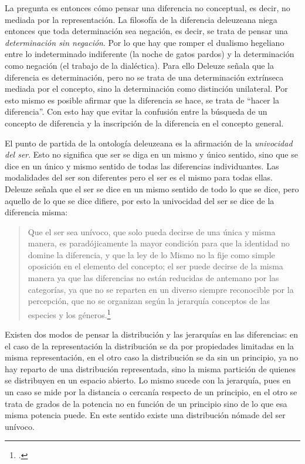 La pregunta es entonces cómo pensar una diferencia no conceptual, es
decir, no mediada por la representación. La filosofía de la diferencia
deleuzeana niega entonces que toda determinación sea negación, es decir,
se trata de pensar una \emph{determinación sin negación}. Por lo que hay
que romper el dualismo hegeliano entre lo indeterminado indiferente (la
noche de gatos pardos) y la determinación como negación (el trabajo de
la dialéctica). Para ello Deleuze señala que la diferencia es
determinación, pero no se trata de una determinación extrínseca mediada
por el concepto, sino la determinación como distinción unilateral. Por
esto mismo es posible afirmar que la diferencia se hace, se trata de
\enquote{hacer la diferencia}. Con esto hay que evitar la confusión entre la
búsqueda de un concepto de diferencia y la inscripción de la diferencia
en el concepto general.

El punto de partida de la ontología deleuzeana es la afirmación de la
\emph{univocidad del ser}. Esto no significa que ser se diga en un mismo
y único sentido, sino que se dice en un único y mismo sentido de todas
las diferencias individuantes. Las modalidades del ser son diferentes
pero el ser es el mismo para todas ellas. Deleuze señala que el ser se
dice en un mismo sentido de todo lo que se dice, pero aquello de lo que
se dice difiere, por esto la univocidad del ser se dice de la diferencia
misma:

\begin{quote}
Que el ser sea unívoco, que solo pueda decirse de una única y misma
manera, es paradójicamente la mayor condición para que la identidad no
domine la diferencia, y que la ley de lo Mismo no la fije como simple
oposición en el elemento del concepto; el ser puede decirse de la misma
manera ya que las diferencias no están reducidas de antemano por las
categorías, ya que no se reparten en un diverso siempre reconocible por
la percepción, que no se organizan según la jerarquía conceptos de las
especies y los géneros.\footcite[42]{foucault1995}
\end{quote}

Existen dos modos de pensar la distribución y las jerarquías en las
diferencias: en el caso de la representación la distribución se da por
propiedades limitadas en la misma representación, en el otro caso la
distribución se da sin un principio, ya no hay reparto de una
distribución representada, sino la misma partición de quienes se
distribuyen en un espacio abierto. Lo mismo sucede con la jerarquía,
pues en un caso se mide por la distancia o cercanía respecto de un
principio, en el otro se trata de grados de la potencia no en función de
un principio sino de lo que esa misma potencia puede. En este sentido
existe una distribución nómade del ser unívoco.

